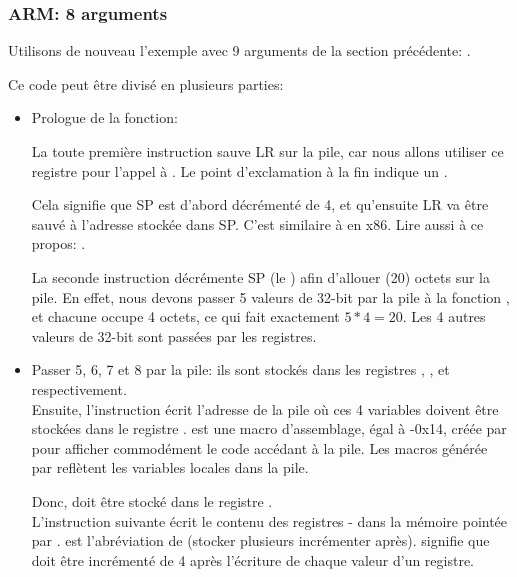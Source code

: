 \subsubsection{ARM: 8 arguments}

Utilisons de nouveau l'exemple avec 9 arguments de la section précédente: .



\myparagraph{\OptimizingKeilVI: \ARMMode}



Ce code peut être divisé en plusieurs parties:

\begin{itemize}
\item Prologue de la fonction:

La toute première instruction  sauve \ac{LR} sur la pile,
car nous allons utiliser ce registre pour l'appel à \printf.
Le point d'exclamation à la fin indique un .

Cela signifie que \ac{SP} est d'abord décrémenté de 4, et qu'ensuite \ac{LR}
va être sauvé à l'adresse stockée dans \ac{SP}.
C'est similaire à \PUSH en x86.
Lire aussi à ce propos: .

La seconde instruction  décrémente \ac{SP} (le )
afin d'allouer  (20) octets sur la pile.
En effet, nous devons passer 5 valeurs de 32-bit par la pile à la fonction \printf,
et chacune occupe 4 octets, ce qui fait exactement $5*4=20$.
Les 4 autres valeurs de 32-bit sont passées par les registres.

\item Passer 5, 6, 7 et 8 par la pile: ils sont stockés dans les registres ,
,  et  respectivement.\\
Ensuite, l'instruction  écrit l'adresse de la pile
où ces 4 variables doivent être stockées dans le registre .
 est une macro d'assemblage, égal à -0x14, créée par \IDA pour afficher
commodément le code accédant à la pile.
Les macros  générée par \IDA reflètent les variables locales dans la pile.

Donc,  doit être stocké dans le registre . \\
L'instruction suivante  écrit le contenu des registres
- dans la mémoire pointée par .
 est l'abréviation de  (stocker plusieurs incrémenter après).
 signifie que  doit être incrémenté de 4 après
l'écriture de chaque valeur d'un registre.


\end{itemize}
